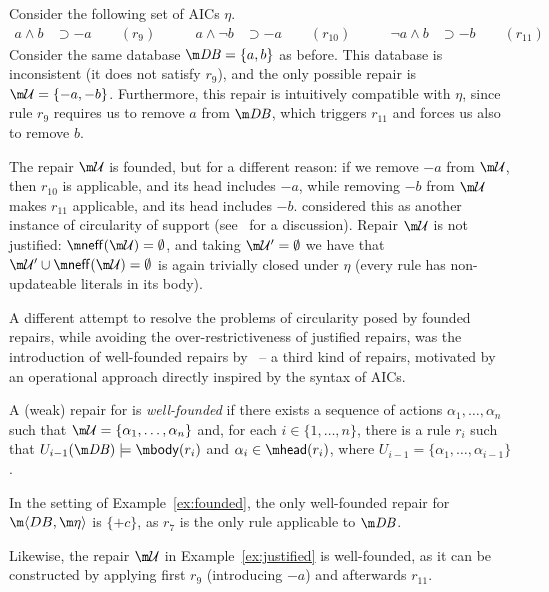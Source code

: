 \begin{example}
  \label{ex:justified}
  Consider the following set of AICs $\eta$.
  \begin{align*}
  a\land b &\supset{-a} \qquad (r_9) \qquad &
  a\land\neg b &\supset{-a} \qquad (r_{10}) \qquad &
  \neg a\land b &\supset{-b} \qquad (r_{11})
  \end{align*}
  Consider the same database $\db=\{a,b\}$ as before.
  This database is inconsistent (it does not satisfy $r_9$), and the only possible repair is $\UU=\{{-a},{-b}\}$.
  Furthermore, this repair is intuitively compatible with $\eta$, since rule $r_9$ requires us to remove $a$ from $\db$, which triggers $r_{11}$ and forces us also to remove $b$.

  The repair $\UU$ is founded, but for a different reason: if we remove ${-a}$ from $\UU$, then $r_{10}$ is applicable, and its head includes $-a$, while removing ${-b}$ from $\UU$ makes $r_{11}$ applicable, and its head includes $-b$.
  \citet{tplp/CaropreseT11} considered this as another instance of circularity of support (see~\cite{tase/Cruz-FilipeEGN13} for a discussion).
  Repair $\UU$ is not justified: $\neff(\UU)=\emptyset$, and taking $\UU'=\emptyset$ we have that $\UU'\cup\neff(\UU)=\emptyset$ is again trivially closed under $\eta$ (every rule has non-updateable literals in its body).
\end{example}

A different attempt to resolve the problems of circularity posed by founded repairs, while avoiding the over-restrictiveness of justified repairs, was the introduction of well-founded repairs by~\citet{tase/Cruz-FilipeEGN13} -- a third kind of repairs, motivated by an operational approach directly inspired by the syntax of AICs.


\begin{definition}
 A (weak) repair \UU for \fulldb is \emph{well-founded} if there exists a sequence of actions $\alpha_1,\dots,\alpha_n$ such that $\UU=\{\alpha_1,\dots,\alpha_n\}$ and, for each $i\in\{1,\dots,n\}$, there is a rule $r_i$ such that $U_{i-1}(\db) \models \body (r_i)$ and $\alpha_i \in \head(r_i)$, where $U_{i-1} = \{\alpha_1,\dots,\alpha_{i-1}\}$.
\end{definition}

\begin{example}
  In the setting of Example~\ref{ex:founded}, the only well-founded repair for $\fulldb$ is $\{{+c}\}$, as $r_7$ is the only rule applicable to $\db$.

  Likewise, the repair $\UU$ in Example~\ref{ex:justified} is well-founded, as it can be constructed by applying first $r_9$ (introducing ${-a}$) and afterwards $r_{11}$.
\end{example}

